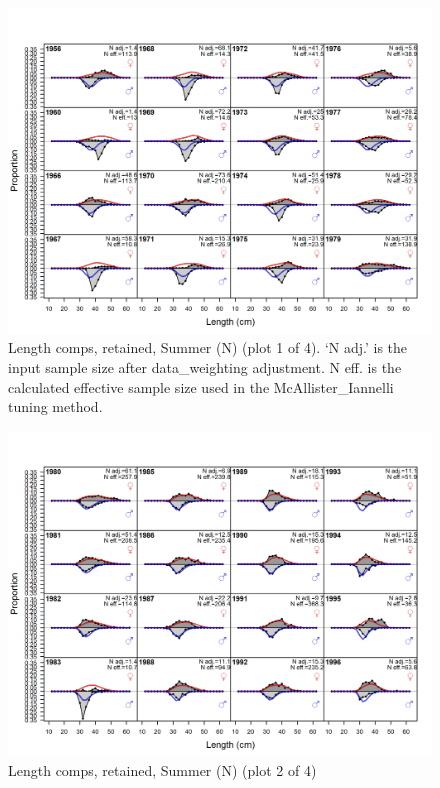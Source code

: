 \documentclass[12pt,]{article}
\begin{document}
\begin{figure}
\centering
\includegraphics{r4ss/plots_mod1/comp_lenfit_flt2mkt2_page1.png}
\caption{Length comps, retained, Summer (N) (plot 1 of 4). `N adj.' is
the input sample size after data\_weighting adjustment. N eff. is the
calculated effective sample size used in the McAllister\_Iannelli tuning
method. \label{fig:length_fits}}
\end{figure}

\begin{figure}
\centering
\includegraphics{r4ss/plots_mod1/comp_lenfit_flt2mkt2_page2.png}
\caption{Length comps, retained, Summer (N) (plot 2 of 4)
\label{fig:length_fits}}
\end{figure}
\end{document}
